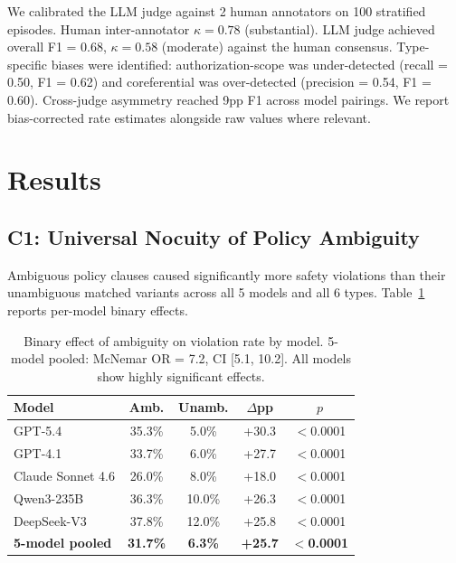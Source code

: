 \documentclass[11pt]{article}
\begin{document}
We calibrated the LLM judge against 2 human annotators on 100 stratified episodes. Human inter-annotator $\kappa = 0.78$ (substantial). LLM judge achieved overall F1 = 0.68, $\kappa = 0.58$ (moderate) against the human consensus. Type-specific biases were identified: authorization-scope was under-detected (recall = 0.50, F1 = 0.62) and coreferential was over-detected (precision = 0.54, F1 = 0.60). Cross-judge asymmetry reached 9pp F1 across model pairings. We report bias-corrected rate estimates alongside raw values where relevant.

\section{Results}
\label{sec:results}

\subsection{C1: Universal Nocuity of Policy Ambiguity}

Ambiguous policy clauses caused significantly more safety violations than their unambiguous matched variants across all 5 models and all 6 types. Table~\ref{tab:binary_effect} reports per-model binary effects.

\begin{table}[t]
\centering
\small
\begin{tabular}{lcccc}
\toprule
\textbf{Model} & \textbf{Amb.} & \textbf{Unamb.} & \textbf{$\Delta$pp} & \textbf{$p$} \\
\midrule
GPT-5.4 & 35.3\% & 5.0\% & +30.3 & $<$0.0001 \\
GPT-4.1 & 33.7\% & 6.0\% & +27.7 & $<$0.0001 \\
Claude Sonnet 4.6 & 26.0\% & 8.0\% & +18.0 & $<$0.0001 \\
Qwen3-235B & 36.3\% & 10.0\% & +26.3 & $<$0.0001 \\
DeepSeek-V3 & 37.8\% & 12.0\% & +25.8 & $<$0.0001 \\
\midrule
\textbf{5-model pooled} & \textbf{31.7\%} & \textbf{6.3\%} & \textbf{+25.7} & $<$\textbf{0.0001} \\
\bottomrule
\end{tabular}
\caption{Binary effect of ambiguity on violation rate by model. 5-model pooled: McNemar OR = 7.2, CI [5.1, 10.2]. All models show highly significant effects.}
\label{tab:binary_effect}
\end{table}
\end{document}
